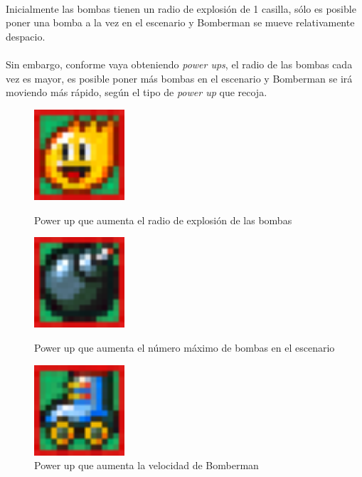 \documentclass[a4paper]{article}
\begin{document}
\paragraph{}Inicialmente las bombas tienen un radio de explosión de 1 casilla, sólo es posible poner una bomba a la vez en el escenario y Bomberman se mueve relativamente despacio. 
\newpage
\paragraph{}Sin embargo, conforme vaya obteniendo \textit{power ups}, el radio de las bombas cada vez es mayor, es posible poner más bombas en el escenario y Bomberman se irá moviendo más rápido, según el tipo de \textit{power up} que recoja.
\begin{figure}[H]
	\centering
	\begin{minipage}[b]{0.4\textwidth}
		\centering
		\includegraphics[width=0.3\textwidth]{fuego.png}
		\caption{Power up que aumenta el radio de explosión de las bombas}
	\end{minipage}
	\hfill
	\begin{minipage}[b]{0.4\textwidth}
		\centering
		\includegraphics[width=0.3\textwidth]{bomba.png}
		\caption{Power up que aumenta el número máximo de bombas en el escenario}
	\end{minipage}
	\hfill
	\begin{minipage}[b]{0.4\textwidth}
		\centering
		\includegraphics[width=0.3\textwidth]{patines.png}
		\caption{Power up que aumenta la velocidad de Bomberman}
	\end{minipage}
	\label{fig:powerups}
\end{figure}
\end{document}
